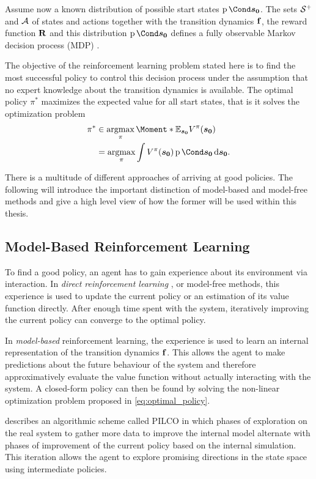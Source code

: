 Assume now a known distribution of possible start states $\Prob{\rv{s_0}}$.
The sets $\mathcal{S}^+$ and $\mathcal{A}$ of states and actions together with the transition dynamics $\operatorname{\mathbf{f}}$, the reward function $\operatorname{\mathbf{R}}$ and this distribution $\Prob{\rv{s_0}}$ defines a fully observable Markov decision process (MDP) \cite{sutton_reinforcement_1998,murphy_machine_2012}.

The objective of the reinforcement learning problem stated here is to find the most successful policy to control this decision process under the assumption that no expert knowledge about the transition dynamics is available.
The optimal policy $\pi^*$ maximizes the expected value for all start states, that is it solves the optimization problem
\begin{align}
    \label{eq:optimal_policy}
    \pi^* &\in \argmax_{\pi} \Moment*{\E_{\rv{s_0}}}{V^\pi(\rv{s_0})} \\
    &= \argmax_{\pi} \int V^\pi(\rv{s_0}) \Prob{\rv{s_0}} \diff \rv{s_0}.
\end{align}

There is a multitude of different approaches of arriving at good policies.
The following will introduce the important distinction of model-based and model-free methods and give a high level view of how the former will be used within this thesis.

\subsection{Model-Based Reinforcement Learning}
To find a good policy, an agent has to gain experience about its environment via interaction.
In \emph{direct reinforcement learning} \cite{sutton_reinforcement_1998}, or model-free methods, this experience is used to update the current policy or an estimation of its value function directly.
After enough time spent with the system, iteratively improving the current policy can converge to the optimal policy.

In \emph{model-based} reinforcement learning, the experience is used to learn an internal representation of the transition dynamics $\operatorname{\mathbf{f}}$.
This allows the agent to make predictions about the future behaviour of the system and therefore approximatively evaluate the value function without actually interacting with the system.
A closed-form policy can then be found by solving the non-linear optimization problem proposed in \cref{eq:optimal_policy}.

\citeauthor{deisenroth_efficient_2010} \cite{deisenroth_efficient_2010} describes an algorithmic scheme called PILCO in which phases of exploration on the real system to gather more data to improve the internal model alternate with phases of improvement of the current policy based on the internal simulation.
This iteration allows the agent to explore promising directions in the state space using intermediate policies.

